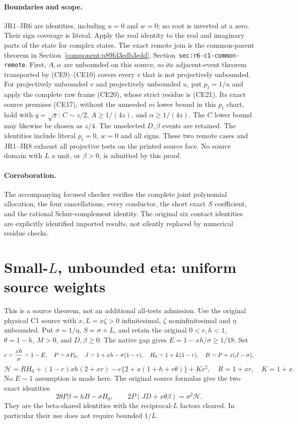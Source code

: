 \paragraph{Boundaries and scope.}
JR1--JR6 are identities, including $u=0$ and $w=0$; no root is inverted
at a zero. Their sign coverage is literal. Apply the real identity to
the real and imaginary parts of the state for complex states.
The exact remote join is the common-parent theorem in
Section~\ref{component:p89fd3edb3edd},
Section~\texttt{sec:r6-c1-common-remote}. First, $A,\alpha$ are
unbounded on this source, so its adjacent-event theorem transported by
(CE9)--(CE10) covers every $v$ that is not projectively unbounded.
For projectively unbounded $v$ and projectively unbounded $u$, put
$p_t=1/u$ and apply the complete raw frame (CE20), whose strict
residue is (CE21). Its exact source premises (CE17), without the
unneeded $m$ lower bound in this $p_t$ chart, hold with $q=\sqrt z$:
$C\sim z/2$, $A\ge1/(4z)$, and $\alpha\ge1/(4z)$.
The $C$ lower bound may likewise be chosen as $z/4$. The unselected
$D,\beta$ events are retained. The identities include literal
$p_t=0$, $w=0$ and all signs. These two remote cases and JR1--JR8
exhaust all projective tests on the printed source face. No source
domain with $L$ a unit, or $\beta>0$, is admitted by this proof.

\paragraph{Corroboration.}
The accompanying focused checker verifies the complete joint polynomial
allocation, the four cancellations, every conductor, the short exact
$S$ coefficient, and the rational Schur-complement identity. The
original six contact identities are explicitly identified imported
results, not silently replaced by numerical residue checks.


\section{\texorpdfstring{Small-$L$, unbounded eta: uniform source weights}{Small-L, unbounded eta: uniform source weights}}
\label{component:p66922bb7f235}

\label{p66922bb7f235:sec:r13-small-L-eta-large-bounds}

This is a source theorem, not an additional all-tests admission.
Use the original physical C1 source with $x,L=x\zeta>0$
infinitesimal, $\zeta$ noninfinitesimal and $\eta$ unbounded.
Put $\sigma=1/\eta$, $S=\sigma+L$, and retain the original
$0<r,h<1$, $\theta=1-h$, $M>0$, and $D,\beta\ge0$.
The native gap gives $E=1-xh/\sigma\ge1/18$. Set
\[
 e={xh\over\sigma}=1-E,\quad
 P=\sigma P_d,\quad J=1+xh-\sigma(1-r),\quad
 H_0=1+L(1-r),\quad B=P+x(J-\sigma),
\]
\[
 \mathcal H=R H_0+(1-r)xh(2+xr)
 -e\{2+x(1+h+r\theta)\}+Ke^2,
 \quad R=1+xr,\quad K=1+x.                           \tag{ES1}
\]
No $E\sim1$ assumption is made here. The original source formulas
give the two exact identities
\[
 2\theta P\beta=hB-\sigma H_0,\qquad
 2P(JD+x\theta\beta)=\sigma^2\mathcal H.             \tag{ES2}
\]
They are the beta-shared identities with the reciprocal-$L$ factors
cleared. In particular their use does not require bounded $1/L$.


